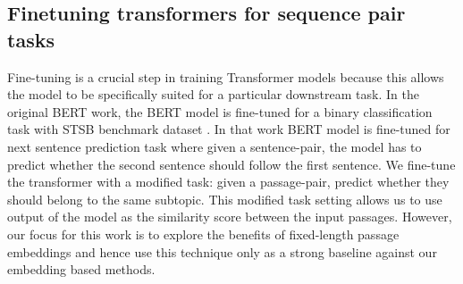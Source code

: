 \subsection{Finetuning transformers for sequence pair tasks} Fine-tuning is a crucial step in training Transformer models because this allows the model to be specifically suited for a particular downstream task. In the original BERT work, the BERT model is fine-tuned for a binary classification task with STSB benchmark dataset . In that work BERT model is fine-tuned for next sentence prediction task where given a sentence-pair, the model has to predict whether the second sentence should follow the first sentence. We fine-tune the   transformer with a modified task: given a passage-pair, predict whether they should belong to the same subtopic. This modified task setting allows us to use output of the model as the similarity score between the input passages. However, our focus for this work is to explore the benefits of fixed-length passage embeddings and hence use this technique only as a strong baseline against our embedding based methods.